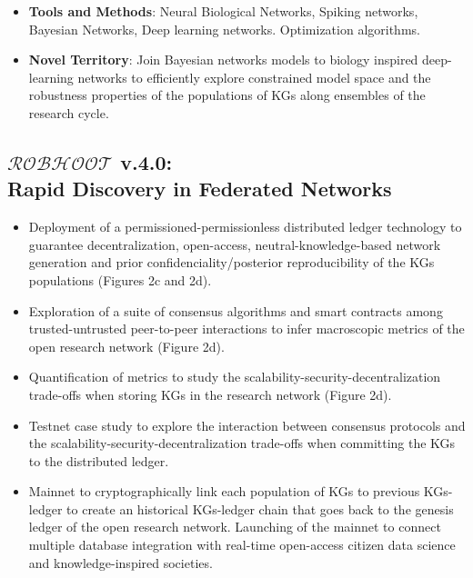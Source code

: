\documentclass[12pt, a4paper]{article} %
\begin{document}
 \begin{itemize}
 \item {\bf Tools and Methods}: Neural Biological Networks, Spiking
   networks, Bayesian Networks, Deep learning networks. Optimization
   algorithms.
 \end{itemize}

  \begin{itemize}
  \item {\bf Novel Territory}: Join Bayesian networks models to
    biology inspired deep-learning networks to efficiently explore
    constrained model space and the robustness properties of the
    populations of KGs along ensembles of the research cycle.
   \end{itemize}
   
  \subsection{{\bf $\mathcal{ROBHOOT}$ v.4.0}: \\ Rapid Discovery in Federated Networks}
  \begin{itemize}
  \item Deployment of a permissioned-permissionless distributed ledger
    technology to guarantee decentralization, open-access,
    neutral-knowledge-based network generation and prior
    confidenciality/posterior reproducibility of the KGs populations
    (Figures 2c and 2d).
  \item Exploration of a suite of consensus algorithms and smart
    contracts among trusted-untrusted peer-to-peer interactions to
    infer macroscopic metrics of the open research network (Figure
    2d).
  \item Quantification of metrics to study the
    scalability-security-decentralization trade-offs when storing KGs
    in the research network (Figure 2d).
  \item Testnet case study to explore the interaction between
    consensus protocols and the scalability-security-decentralization
    trade-offs when committing the KGs to the distributed ledger.
  \item Mainnet to cryptographically link each population of KGs to
    previous KGs-ledger to create an historical KGs-ledger chain that
    goes back to the genesis ledger of the open research
    network. Launching of the mainnet to connect multiple database
    integration with real-time open-access citizen data science and
    knowledge-inspired societies.
  \end{itemize}
\end{document}
